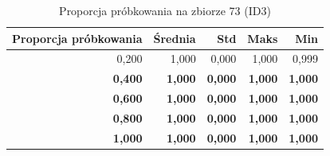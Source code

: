 \begin{table}[htbp]
\centering
\small
\setlength{\tabcolsep}{6pt}
\renewcommand{\arraystretch}{1.2}
\caption{Proporcja próbkowania na zbiorze 73 (ID3)}
\label{tab:ID3_sample_ratio_73}
\begin{tabular}{r|r|r|r|r}
\toprule
Proporcja próbkowania & Średnia & Std & Maks & Min \\
\hline
0,200 & 1,000 & 0,000 & 1,000 & 0,999 \\
\textbf{0,400} & \textbf{1,000} & \textbf{0,000} & \textbf{1,000} & \textbf{1,000} \\
\textbf{0,600} & \textbf{1,000} & \textbf{0,000} & \textbf{1,000} & \textbf{1,000} \\
\textbf{0,800} & \textbf{1,000} & \textbf{0,000} & \textbf{1,000} & \textbf{1,000} \\
\textbf{1,000} & \textbf{1,000} & \textbf{0,000} & \textbf{1,000} & \textbf{1,000} \\
\bottomrule
\end{tabular}
\end{table}
